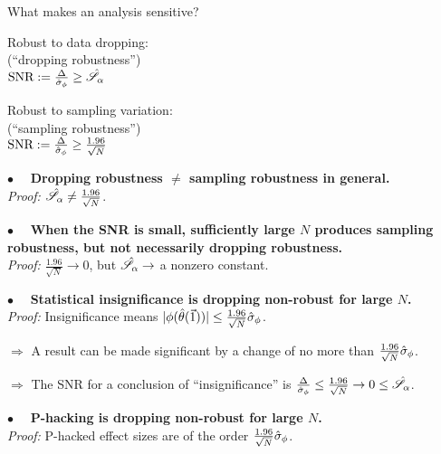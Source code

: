 \begin{frame}[t]{What makes an analysis sensitive?}
%
\begin{minipage}{0.45\textwidth}
\begin{center}
    Robust to data dropping:\\
    (``dropping robustness'')\\
    \vspace{1em}
    $\textrm{SNR} := \frac{\Delta}{\hat\sigma_{\phi}} \ge \hat{\mathscr{S}}_\alpha$
\end{center}
\end{minipage}
%
\begin{minipage}{0.45\textwidth}
\begin{center}
    Robust to sampling variation:\\
    (``sampling robustness'')\\
    \vspace{1em}
    $\textrm{SNR} := \frac{\Delta}{\hat\sigma_{\phi}} \ge
        \frac{1.96}{\sqrt{N}}$
\end{center}
\end{minipage}

\vspace{1em}

\hrulefill

\vspace{0.5em} $\bullet\quad$
\textbf{Dropping robustness $\ne$ sampling robustness in general.\\}
\textit{Proof: }
$\hat{\mathscr{S}}_\alpha \ne \frac{1.96}{\sqrt{N}}$.

\vspace{0.5em} $\bullet\quad$
\textbf{When the SNR is small, sufficiently large $N$
produces sampling robustness, but not necessarily
dropping robustness.\\}
\textit{Proof: }
$\frac{1.96}{\sqrt{N}} \rightarrow 0$, but $\hat{\mathscr{S}}_\alpha \rightarrow$ a nonzero
constant.

\vspace{0.5em} $\bullet\quad$
\textbf{Statistical insignificance is dropping non-robust for large $N$.\\}
\textit{Proof: }
%
Insignificance means
$|\phi(\hat{\theta}(\vec{1}))| \le \frac{1.96}{\sqrt{N}} \hat\sigma_{\phi}$.

$\Rightarrow$ A result can be made significant by a change of no more than
$\frac{1.96}{\sqrt{N}} \hat\sigma_{\phi}$.

$\Rightarrow$ The SNR for a conclusion
of ``insignificance'' is $\frac{\Delta}{\hat\sigma_{\phi}} \le \frac{1.96}{\sqrt{N}}
\rightarrow 0 \le \hat{\mathscr{S}}_\alpha$.

\vspace{0.5em} $\bullet\quad$
\textbf{P-hacking is dropping non-robust for large $N$.\\}
\textit{Proof: }P-hacked effect sizes are of the order
$\frac{1.96}{\sqrt{N}} \hat\sigma_{\phi}$.

\end{frame}



